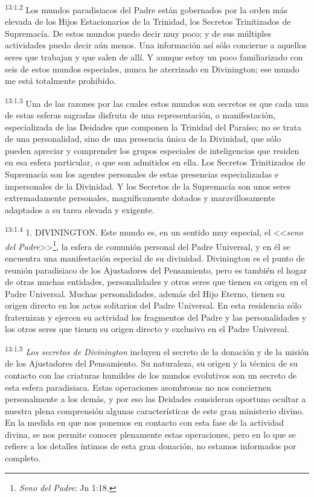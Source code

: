 \par
\textsuperscript{13:1.2} Los mundos paradisiacos del Padre están gobernados por la orden más elevada de los Hijos Estacionarios de la Trinidad, los Secretos Trinitizados de Supremacía. De estos mundos puedo decir muy poco; y de sus múltiples actividades puedo decir aún menos. Una información así sólo concierne a aquellos seres que trabajan y que salen de allí. Y aunque estoy un poco familiarizado con seis de estos mundos especiales, nunca he aterrizado en Divinington; ese mundo me está totalmente prohibido.

\par
\textsuperscript{13:1.3} Una de las razones por las cuales estos mundos son secretos es que cada una de estas esferas sagradas disfruta de una representación, o manifestación, especializada de las Deidades que componen la Trinidad del Paraíso; no se trata de una personalidad, sino de una presencia única de la Divinidad, que sólo pueden apreciar y comprender los grupos especiales de inteligencias que residen en esa esfera particular, o que son admitidos en ella. Los Secretos Trinitizados de Supremacía son los agentes personales de estas presencias especializadas e impersonales de la Divinidad. Y los Secretos de la Supremacía son unos seres extremadamente personales, magníficamente dotados y maravillosamente adaptados a su tarea elevada y exigente.

\par
\textsuperscript{13:1.4} 1. DIVININGTON. Este mundo es, en un sentido muy especial, el <<\textit{seno del Padre}>>\footnote{\textit{Seno del Padre}: Jn 1:18.}, la esfera de comunión personal del Padre Universal, y en él se encuentra una manifestación especial de su divinidad. Divinington es el punto de reunión paradisiaco de los Ajustadores del Pensamiento, pero es también el hogar de otras muchas entidades, personalidades y otros seres que tienen su origen en el Padre Universal. Muchas personalidades, además del Hijo Eterno, tienen su origen directo en los actos solitarios del Padre Universal. En esta residencia sólo fraternizan y ejercen su actividad los fragmentos del Padre y las personalidades y los otros seres que tienen su origen directo y exclusivo en el Padre Universal.

\par
\textsuperscript{13:1.5} \textit{Los secretos de Divinington} incluyen el secreto de la donación y de la misión de los Ajustadores del Pensamiento. Su naturaleza, su origen y la técnica de su contacto con las criaturas humildes de los mundos evolutivos son un secreto de esta esfera paradisiaca. Estas operaciones asombrosas no nos conciernen personalmente a los demás, y por eso las Deidades consideran oportuno ocultar a nuestra plena comprensión algunas características de este gran ministerio divino. En la medida en que nos ponemos en contacto con esta fase de la actividad divina, se nos permite conocer plenamente estas operaciones, pero en lo que se refiere a los detalles íntimos de esta gran donación, no estamos informados por completo.


